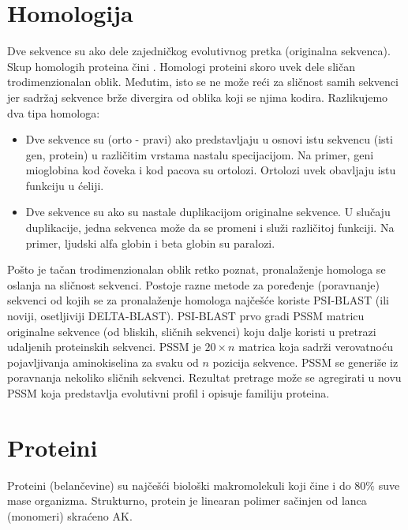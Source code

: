 \section{Homologija}

Dve sekvence su  ako dele zajedničkog evolutivnog pretka
(originalna sekvenca). Skup homologih proteina čini . Homologi proteini skoro uvek dele sličan trodimenzionalan oblik.
Međutim, isto se ne može reći za sličnost samih sekvenci jer sadržaj sekvence
brže divergira od oblika koji se njima kodira. Razlikujemo dva tipa homologa:
\begin{itemize}
  \item
    Dve sekvence su  (orto - pravi) ako predstavljaju u osnovi istu
    sekvencu (isti gen, protein) u različitim vrstama nastalu specijacijom.
    Na primer, geni mioglobina kod čoveka i kod pacova su ortolozi. Ortolozi
    uvek obavljaju istu funkciju u ćeliji.

  \item Dve sekvence su  ako su nastale duplikacijom
    originalne sekvence. U slučaju duplikacije, jedna sekvenca može
    da se promeni i služi različitoj funkciji. Na primer, ljudski
    alfa globin i beta globin su paralozi.
\end{itemize}

Pošto je tačan trodimenzionalan oblik retko poznat, pronalaženje homologa
se oslanja na sličnost sekvenci. Postoje razne metode za poređenje
(poravnanje) sekvenci od kojih se za pronalaženje homologa najčešće koriste
PSI-BLAST (ili noviji, osetljiviji DELTA-BLAST).  PSI-BLAST  prvo gradi PSSM matricu
originalne sekvence (od bliskih, sličnih sekvenci) koju dalje koristi u pretrazi
udaljenih proteinskih sekvenci. PSSM  je
$20 \times n$ matrica koja sadrži verovatnoću pojavljivanja aminokiselina
za svaku od $n$ pozicija sekvence. PSSM se generiše iz poravnanja nekoliko
sličnih sekvenci. Rezultat pretrage može se agregirati u novu PSSM koja
predstavlja evolutivni profil i opisuje familiju proteina. 

\label{sec:}
\section{Proteini}

Proteini (belančevine) su najčešći biološki makromolekuli koji čine i do $80\%$
suve mase organizma.  Strukturno, protein je linearan polimer sačinjen od lanca
 (monomeri) skraćeno AK.

